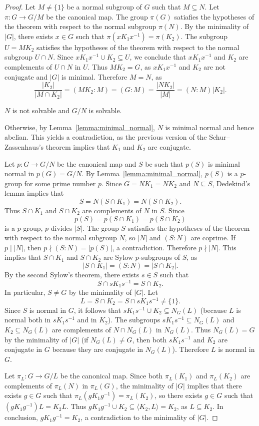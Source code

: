 \begin{proof}
	Let $M\ne\{1\}$ be a normal subgroup of $G$ such that $M\subseteq N$. Let $\pi\colon G\to G/M$
	be the canonical map. The group $\pi(G)$ satiafies the hypotheses of the theorem
	with respect to the normal subgroup $\pi(N)$. By the minimality of $|G|$, there exists 
	$x\in G$ such that $\pi(xK_1x^{-1})=\pi(K_2)$. The subgroup 
	$U=MK_2$ satisfies the hypotheses of the theorem with respect to the normal subgroup 
	$U\cap N$. Since $xK_1x^{-1}\cup K_2\subseteq U$,
	we conclude that $xK_1x^{-1}$ and $K_2$ are complements of $U\cap N$ in $U$.
	Thus $MK_2=G$, as $xK_1x^{-1}$ and $K_2$ are not conjugate and $|G|$ is minimal. 
	Therefore $M=N$, as  
	\[
		\frac{|K_2|}{|M\cap K_2|}=(MK_2:M)=(G:M)=\frac{|NK_2|}{|M|}=(N:M)|K_2|.
	\]

	\begin{claim}
		$N$ is not solvable and $G/N$ is solvable. 
	\end{claim}
	
	Otherwise, by Lemma~\ref{lemma:minimal_normal}, 	$N$ is minimal normal
	and hence abelian. This yields a contradiction, as 
	the previous version of the Schur--Zassenhaus's theorem implies that
	$K_1$ and $K_2$ are conjugate. 
	
	\medskip
	Let $p\colon G\to G/N$ be the canonical map and $S$ be such that $p(S)$
	is minimal normal in $p(G)=G/N$.  By Lemma~\ref{lemma:minimal_normal},
	$p(S)$ is a $p$-group for some prime number $p$.  Since $G=NK_1=NK_2$ and $N\subseteq
	S$, Dedekind's lemma implies that  
	\[
	S=N(S\cap K_1)=N(S\cap K_2).
	\]
	Thus $S\cap K_1$ and $S\cap K_2$
	are complements of $N$ in $S$. Since 
	\[
	p(S)=p(S\cap K_1)=p(S\cap K_2)
	\]
	is a $p$-group,
	$p$ divides $|S|$. The group $S$ 
	satisafies the hypotheses of the theorem 
	with respect to the normal subgroup $N$,
	so $|N|$ and $(S:N)$ are coprime. If $p\mid |N|$, then  
	$p\nmid (S:N)=|p(S)|$, a contradiction. Therefore $p\nmid |N|$. 
	This implies that $S\cap K_1$ and $S\cap K_2$ are
	Sylow $p$-subgroups of $S$, as 
	\[
		|S\cap K_1|=(S:N)=|S\cap K_2|.
	\]
	By the second Sylow's theorem, there exists $s\in
	S$ such that 
	\[
	S\cap sK_1s^{-1}=S\cap K_2.
	\]
	In particular, $S\ne G$ by the minimality of $|G|$.
	Let  
	\[
		L=S\cap K_2=S\cap sK_1s^{-1}\ne\{1\}.
	\]
	Since $S$ is normal in $G$, it follows that $sK_1s^{-1}\cup K_2\subseteq N_G(L)$ (because $L$
	is normal both in $sK_1s^{-1}$ and in $K_2$). The subgroups $sK_1s^{-1}\subseteq
	N_G(L)$ and $K_2\subseteq N_G(L)$ are complements of $N\cap N_G(L)$ in $N_G(L)$. Thus 
	$N_G(L)=G$ by the minimality of $|G|$ (if $N_G(L)\ne G$, then both 
	$sK_1s^{-1}$ and $K_2$ are conjugate in $G$ because they are conjugate in $N_G(L)$). Therefore 
	$L$ is normal in $G$. 
	
	Let $\pi_L\colon G\to G/L$ be the canonical map. Since both 
	$\pi_L(K_1)$ and $\pi_L(K_2)$ are complements of $\pi_L(N)$ in $\pi_L(G)$, the minimality 
	of $|G|$ implies that there exists $g\in G$ such that $\pi_L(gK_1g^{-1})=\pi_L(K_2)$, so  
	there exists $g\in G$ such that $(gK_1g^{-1})L=K_2L$.  Thus $gK_1g^{-1}\cup
	K_2\subseteq \langle K_2,L\rangle=K_2$, as $L\subseteq K_2$. In conclusion,	
	$gK_1g^{-1}=K_2$, a contradiction to the minimality of $|G|$. 
\end{proof}

